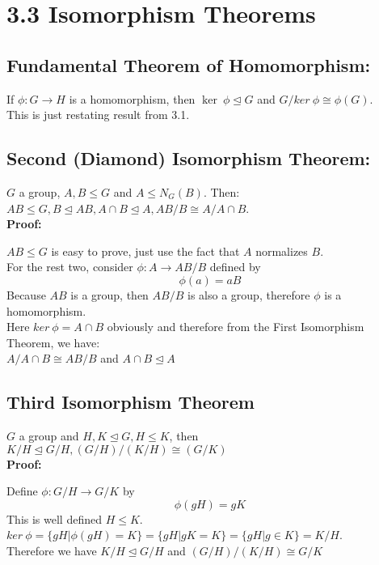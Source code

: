 \documentclass{article}
\begin{document}
\section{3.3 Isomorphism Theorems}
\subsection{Fundamental Theorem of Homomorphism:}
If $\phi:G \rightarrow H$ is a homomorphism, then $\ker\ \phi \trianglelefteq G$ and $G/ker\ \phi \cong \phi(G)$.\\
This is just restating result from 3.1.
\subsection{Second (Diamond) Isomorphism Theorem:}
$G$ a group, $A, B \leq G$ and $A \leq N_G(B)$. Then:\\
$AB \leq G, B \trianglelefteq AB, A \cap B \trianglelefteq A, AB/B \cong A/A \cap B$.\\
\textbf{Proof:}
\begin{addmargin}[1em]{0em}
$AB \leq G$ is easy to prove, just use the fact that $A$ normalizes $B$.\\
For the rest two, consider $\phi: A \rightarrow AB/B$ defined by
\begin{equation*}
    \phi(a) = aB
\end{equation*}
Because $AB$ is a group, then $AB/B$ is also a group, therefore $\phi$ is a homomorphism.\\
Here $ker\ \phi = A \cap B$ obviously and therefore from the First Isomorphism Theorem, we have:\\
$A/A\cap B \cong AB/B$ and $A\cap B \trianglelefteq A$
\end{addmargin}
\subsection{Third Isomorphism Theorem}
$G$ a group and $H, K \trianglelefteq G, H \leq K$, then\\
$K/H \trianglelefteq G/H, (G/H)/(K/H) \cong (G/K)$\\
\textbf{Proof:}
\begin{addmargin}[1em]{0em}
Define $\phi: G/H \rightarrow G/K$ by
\begin{equation*}
    \phi(gH) = gK
\end{equation*}
This is well defined $H \leq K$.\\
$ker\ \phi = \{gH | \phi(gH) = K\} = \{gH | gK = K\} = \{gH | g \in K\} = K/H$.\\
Therefore we have $K/H \trianglelefteq G/H$ and $(G/H)/(K/H) \cong G/K$
\end{addmargin}
\end{document}
